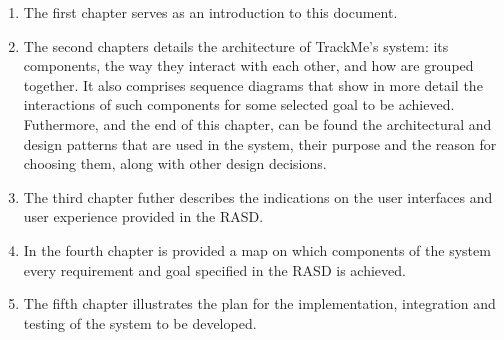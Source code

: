 \documentclass[../main.tex]{subfiles}
\begin{document}
\begin{enumerate}

	\item The first chapter serves as an introduction to this document.
	\item The second chapters details the architecture of TrackMe's system: its components, the way they interact with each other, and how are grouped together. It also comprises sequence diagrams that show in more detail the interactions of such components for some selected goal to be achieved. Futhermore, and the end of this chapter, can be found the architectural and design patterns that are used in the system, their purpose and the reason for choosing them, along with other design decisions.
	\item The third chapter futher describes the indications on the user interfaces and user experience provided in the RASD.
	\item In the fourth chapter is provided a map on which components of the system every requirement and goal specified in the RASD is achieved.
	\item The fifth chapter illustrates the plan for the implementation, integration and testing of the system to be developed.

\end{enumerate}
\end{document}
